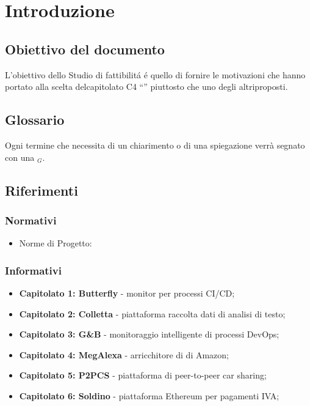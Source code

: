 \chapter{Introduzione}
\section{Obiettivo del documento}
L’obiettivo dello Studio di fattibilit\'a \'e quello di fornire le motivazioni che hanno portato alla scelta delcapitolato C4 “” piuttosto che uno degli altriproposti.
\section{Glossario} 
Ogni termine che necessita di un chiarimento o di una spiegazione verrà segnato con una $_{G}$.
\section{Riferimenti}
\subsection{Normativi}
\begin{itemize}
	\item Norme di Progetto: %
\end{itemize}
\subsection{Informativi}
\begin{itemize}
\item \textbf{Capitolato 1: Butterfly} - monitor per processi CI/CD;
\item \textbf{Capitolato 2: Colletta} - piattaforma raccolta dati di analisi di testo;
\item \textbf{Capitolato 3: G\&B} - monitoraggio intelligente di processi DevOps;
\item \textbf{Capitolato 4: MegAlexa} - arricchitore di di Amazon;
\item \textbf{Capitolato 5: P2PCS} - piattaforma di peer-to-peer car sharing;
\item \textbf{Capitolato 6: Soldino} - piattaforma Ethereum per pagamenti IVA;

\end{itemize}
